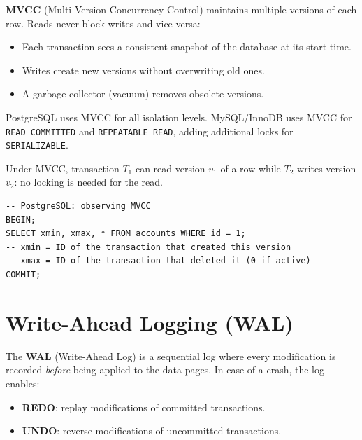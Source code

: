 \begin{definition}[MVCC]
\textbf{MVCC} (Multi-Version Concurrency Control) maintains multiple
versions of each row. Reads never block writes and vice versa:
\begin{itemize}
  \item Each transaction sees a consistent snapshot of the database at its
        start time.
  \item Writes create new versions without overwriting old ones.
  \item A garbage collector (vacuum) removes obsolete versions.
\end{itemize}
\end{definition}

\begin{remark}
PostgreSQL uses MVCC for all isolation levels. MySQL/InnoDB uses MVCC for
\texttt{READ COMMITTED} and \texttt{REPEATABLE READ}, adding additional
locks for \texttt{SERIALIZABLE}.
\end{remark}

\begin{example}
Under MVCC, transaction $T_1$ can read version $v_1$ of a row while $T_2$
writes version $v_2$: no locking is needed for the read.
\begin{verbatim}
-- PostgreSQL: observing MVCC
BEGIN;
SELECT xmin, xmax, * FROM accounts WHERE id = 1;
-- xmin = ID of the transaction that created this version
-- xmax = ID of the transaction that deleted it (0 if active)
COMMIT;
\end{verbatim}
\end{example}

\section{Write-Ahead Logging (WAL)}

\begin{definition}
The \textbf{WAL} (Write-Ahead Log) is a sequential log where every
modification is recorded \emph{before} being applied to the data pages.
In case of a crash, the log enables:
\begin{itemize}
  \item \textbf{REDO}: replay modifications of committed transactions.
  \item \textbf{UNDO}: reverse modifications of uncommitted transactions.
\end{itemize}
\end{definition}

